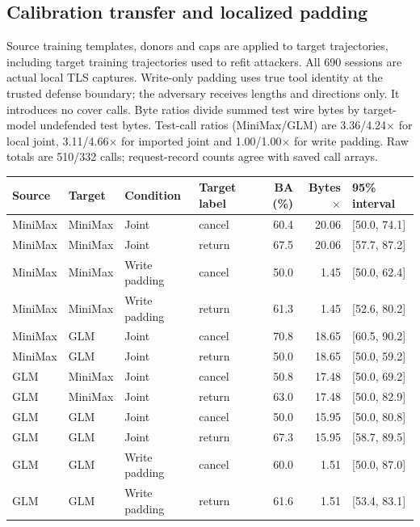 \subsection{Calibration transfer and localized padding}

Source training templates, donors and caps are applied to target trajectories, including target training trajectories used to refit attackers. All 690 sessions are actual local TLS captures. Write-only padding uses true tool identity at the trusted defense boundary; the adversary receives lengths and directions only. It introduces no cover calls. Byte ratios divide summed test wire bytes by target-model undefended test bytes. Test-call ratios (MiniMax/GLM) are 3.36/4.24$\times$ for local joint, 3.11/4.66$\times$ for imported joint and 1.00/1.00$\times$ for write padding. Raw totals are 510/332 calls; request-record counts agree with saved call arrays.

\begin{center}\small\begin{tabular}{llllrrl}\toprule

Source & Target & Condition & Target label & BA (\%) & Bytes$\times$ & 95\% interval\\\midrule

MiniMax & MiniMax & Joint & cancel & 60.4 & 20.06 & [50.0, 74.1]\\

MiniMax & MiniMax & Joint & return & 67.5 & 20.06 & [57.7, 87.2]\\

MiniMax & MiniMax & Write padding & cancel & 50.0 & 1.45 & [50.0, 62.4]\\

MiniMax & MiniMax & Write padding & return & 61.3 & 1.45 & [52.6, 80.2]\\

MiniMax & GLM & Joint & cancel & 70.8 & 18.65 & [60.5, 90.2]\\

MiniMax & GLM & Joint & return & 50.0 & 18.65 & [50.0, 59.2]\\

GLM & MiniMax & Joint & cancel & 50.8 & 17.48 & [50.0, 69.2]\\

GLM & MiniMax & Joint & return & 63.0 & 17.48 & [50.0, 82.9]\\

GLM & GLM & Joint & cancel & 50.0 & 15.95 & [50.0, 80.8]\\

GLM & GLM & Joint & return & 67.3 & 15.95 & [58.7, 89.5]\\

GLM & GLM & Write padding & cancel & 60.0 & 1.51 & [50.0, 87.0]\\

GLM & GLM & Write padding & return & 61.6 & 1.51 & [53.4, 83.1]\\

\bottomrule\end{tabular}\end{center}

